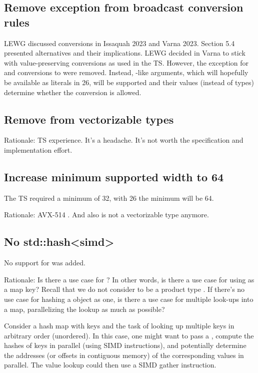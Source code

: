 \subsection{Remove  exception from broadcast conversion rules}\label{sec:broadcastexception}

LEWG discussed conversions in Issaquah 2023 and Varna 2023.
 Section 5.4 presented alternatives and their implications.
LEWG decided in Varna to stick with value-preserving conversions as used in the
TS.
However, the exception for  and  conversions to
 were removed.
Instead, -like arguments, which will hopefully be
available as literals in \CC{}26, will be supported and their values (instead
of types) determine whether the conversion is allowed.

\subsection{Remove  from vectorizable types}

Rationale: TS experience. It's a headache.
It's not worth the specification and implementation effort.

\subsection{Increase minimum supported width to 64}

The TS required a minimum of 32, with \CC{}26 the minimum will be 64.

Rationale: AVX-514 .
And also  is not a vectorizable type anymore.

\subsection{No std::hash<simd>}\label{sec:hash}

No support for \std{} was added.

Rationale:
Is there a use case for \std{}?
In other words, is there a use case for using \simdT as a map key?
Recall that we do not consider \simdT to be a product type \cite{P0851R0}.
If there's no use case for hashing a \simdT object as one, is there a use case
for multiple look-ups into a map, parallelizing the lookup as much as possible?

Consider a hash map with  keys and the task of looking up multiple
keys in arbitrary order (unordered).
In this case, one might want to pass a , compute the hashes of
 keys in parallel (using SIMD instructions), and
potentially determine the addresses (or offsets in contiguous memory) of the
corresponding values in parallel.
The value lookup could then use a SIMD gather instruction.

